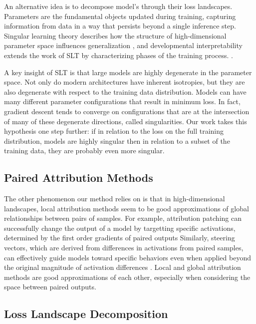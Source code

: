\documentclass{article}
\theoremstyle{plain}
\theoremstyle{definition}
\theoremstyle{remark}
\begin{document}
An alternative idea is to decompose model’s through their loss landscapes. Parameters are the fundamental objects updated during training, capturing information from data in a way that persists beyond a single inference step. Singular learning theory describes how the structure of high-dimensional parameter space influences generalization \cite{watanabe2007almost,watanabe2000algebraic,watanabe2005algebraic, bushnaq2024using, davies2023unifying}, and developmental interpretability extends the work of SLT by characterizing phases of the training process. \cite{wang2024loss,hoogland2024developmental}. 

A key insight of SLT is that large models are highly degenerate \cite{wei2022deep} in the parameter space. Not only do modern architectures have inherent isotropies, but they are also degenerate with respect to the training data distribution. Models can have many different parameter configurations that result in minimum loss. In fact, gradient descent tends to converge on configurations that are at the intersection of many of these degenerate directions, called singularities.  Our work takes this hypothesis one step further: if in relation to the loss on the full training distribution, models are highly singular then in relation to a subset of the training data, they are probably even more singular. 

\subsection{Paired Attribution Methods}

The other phenomenon our method relies on is that in high-dimensional landscapes, local attribution methods seem to be good approximations of global relationships between pairs of samples. For example, attribution patching can successfully change the output of a model by targetting specific activations, determined by the first order gradients of paired outputs \cite{nanda2023attribution,kramar2024atp,syed2023attribution} Similarly, steering vectors, which are derived from differences in activations from paired samples, can effectively guide models toward specific behaviors even when applied beyond the original magnitude of activation differences \cite{turner2023steering,subramani2022extracting}. Local and global attribution methods are good approximations of each other, especially when considering the space between paired outputs. 


\subsection{Loss Landscape Decomposition}
\end{document}

